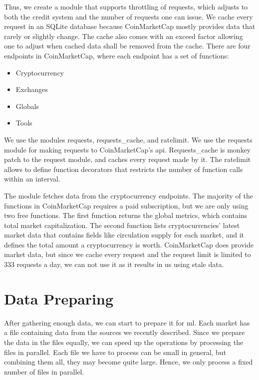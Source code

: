 Thus, we create a module that supports throttling of requests, which adjusts to both the credit system and the number of requests one can issue. We cache every request in an SQLite database because CoinMarketCap mostly provides data that rarely or slightly change. The cache also comes with an exceed factor allowing one to adjust when cached data shall be removed from the cache. There are four endpoints in CoinMarketCap, where each endpoint has a set of functions:

\begin{itemize}
    \item Cryptocurrency
    \item Exchanges
    \item Globals
    \item Tools
\end{itemize}

We use the modules requests, requests\_cache, and ratelimit. We use the requests module for making requests to CoinMarketCap's \ac{api}. Requests\_cache is monkey patch to the request module, and caches every request made by it. The ratelimit allows to define function decorators that restricts the number of function calls within an interval.

The module fetches data from the cryptocurrency endpoints. The majority of the functions in CoinMarketCap requires a paid subscription, but we are only using two free functions. The first function returns the global metrics, which contains total market capitalization. The second function lists cryptocurrencies' latest market data that contains fields like circulation supply for each market, and it defines the total amount a cryptocurrency is worth. CoinMarketCap does provide market data, but since we cache every request and the request limit is limited to $333$ requests a day, we can not use it as it results in us using stale data.


\section{Data Preparing}
After gathering enough data, we can start to prepare it for \ac{ml}. Each market has a file containing data from the sources we recently described. Since we prepare the data in the files equally, we can speed up the operations by processing the files in parallel. Each file we have to process can be small in general, but combining them all, they may become quite large. Hence, we only process a fixed number of files in parallel.

